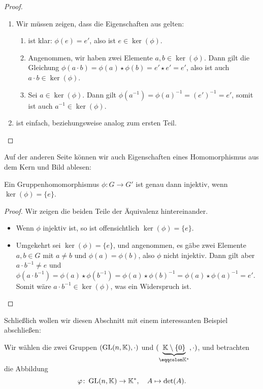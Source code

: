 {\begin{proof}
  \begin{enumerate}[label=\alph*)]
    \item Wir müssen zeigen, dass die Eigenschaften aus  gelten:
    \begin{enumerate}
      \item ist klar: $\phi(e)=e'$, also ist $e \in \ker(\phi)$.
      \item Angenommen, wir haben zwei Elemente $a,b \in \ker(\phi)$. Dann gilt die Gleichung $\phi(a \cdot b) = \phi(a) \star \phi(b) = e' \star e' = e'$, also ist auch $a \cdot b \in \ker(\phi)$.
      \item Sei $a \in \ker(\phi)$. Dann gilt $\phi(a^{-1}) = \phi(a)^{-1} = (e')^{-1} = e'$, somit ist auch $a^{-1} \in \ker(\phi)$.
    \end{enumerate}
    \item ist einfach, beziehungsweise analog zum ersten Teil.
  \end{enumerate}
\end{proof}

Auf der anderen Seite können wir auch Eigenschaften eines Homomorphismus aus dem Kern und Bild ablesen:

\begin{proposition}
  Ein Gruppenhomomorphismus $\phi \colon G \rightarrow G'$ ist genau dann injektiv, wenn $\ker(\phi) = \{e\}$.
\end{proposition}

\begin{proof}
  Wir zeigen die beiden Teile der Äquivalenz hintereinander.
  \begin{itemize}
    \item Wenn $\phi$ injektiv ist, so ist offensichtlich $\ker(\phi) = \{e\}$.
    \item Umgekehrt sei $\ker(\phi) = \{e\}$, und angenommen, es gäbe zwei Elemente $a,b \in G$ mit $a \neq b$ und $\phi(a) = \phi(b)$, also $\phi$ nicht injektiv. Dann gilt aber $a \cdot b^{-1} \neq e$ und $\phi(a\cdot b^{-1}) = \phi(a) \star \phi(b^{-1}) = \phi(a) \star \phi(b)^{-1} = \phi(a) \star \phi(a)^{-1} = e'$.
    Somit wäre $a \cdot b^{-1} \in \ker(\phi)$, was ein Widerspruch ist.
  \end{itemize}
\end{proof}

Schließlich wollen wir diesen Abschnitt mit einem interessanten Beispiel abschließen:

\begin{example}
  Wir wählen die zwei Gruppen $(\operatorname{GL}(n,\mathbb{K}),\cdot)$ und $(\underbrace{\KK\setminus\{0\}}_{\eqqcolon \KK^\ast},\cdot)$, und betrachten die Abbildung
  \[\phi \colon \GL(n,\KK) \rightarrow \KK^\ast, \quad A \mapsto \det(A).\]


\end{example}}
